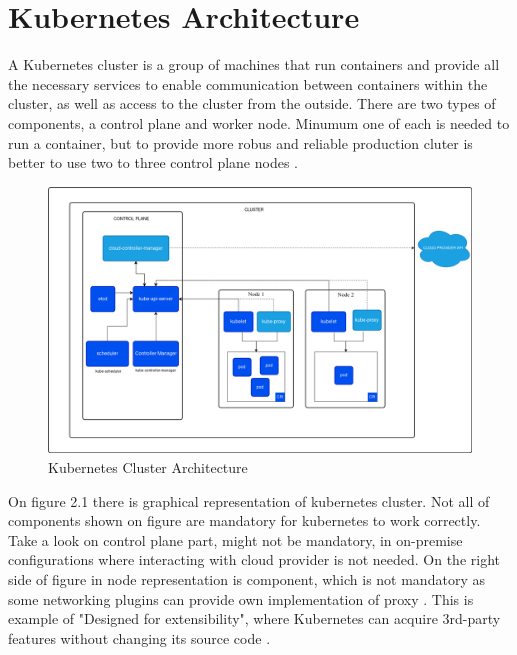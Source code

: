 
\section{Kubernetes Architecture}
\label{sec:k8s_arch}
A Kubernetes cluster is a group of machines that run containers and provide all the necessary services to enable communication between containers within the cluster, as well as access to the cluster from the outside. There are two types of components, a control plane and worker node. Minumum one of each is needed to run a container, but to provide more robus and reliable production cluter is better to use two to three control plane nodes  \cite{KubernetesArch}. 

\begin{figure}[tbh]
    \centering
    \includegraphics[width=1\columnwidth]{images/kubernetes-cluster-architecture.png}
    \caption{Kubernetes Cluster Architecture \cite{KubernetesArch}}
    \label{fig:k8s_arch}
\end{figure}

On figure 2.1 there is graphical representation of kubernetes cluster. Not all of components shown on figure are mandatory for kubernetes to work correctly. Take a look on control plane part, \textit{} might not be mandatory, in on-premise configurations where interacting with cloud provider is not needed. On the right side of figure in node representation is \textit{} component, which is not mandatory as some networking plugins can provide own implementation of proxy \cite{KubernetesArch}. This is example of "Designed for extensibility", where Kubernetes can acquire 3rd-party features without changing its source code \cite{KubernetesDocs}.

